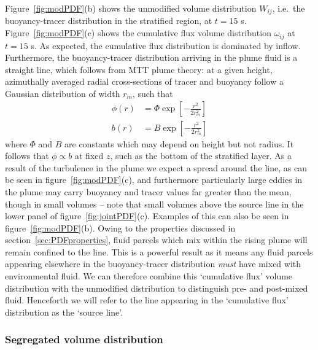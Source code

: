 \documentclass[a4paper]{article}
\begin{document}
Figure~\ref{fig:modPDF}(b) shows the unmodified volume distribution $W_{ij}$, i.e.\ the buoyancy-tracer
distribution in the stratified region, at $t = 15$ s. Figure~\ref{fig:modPDF}(c) shows the cumulative flux
volume distribution $\omega_{ij}$ at $t = 15$ s. As expected, the cumulative flux distribution is dominated by
inflow. Furthermore, the buoyancy-tracer distribution arriving in the plume fluid is a straight line, which
follows from MTT plume theory: at a given height, azimuthally averaged radial cross-sections of tracer and
buoyancy follow a Gaussian distribution of width $r_m$, such that
\begin{align}
	\phi(r) &= \Phi \exp \left[ - \frac{r^2}{2r_m^2}\right] \\
	b(r) &= B \exp \left[ - \frac{r^2}{2r_m^2}\right]
\end{align}
where $\Phi$ and $B$ are constants which may depend on height but not radius. It follows that $\phi \propto b$
at fixed $z$, such as the bottom of the stratified layer. As a result of the turbulence in the plume we expect
a spread around the line, as can be seen in figure~\ref{fig:modPDF}(c), and furthermore particularly large
eddies in the plume may carry buoyancy and tracer values far greater than the mean, though in small volumes --
note that small volumes above the source line in the lower panel of figure~\ref{fig:jointPDF}(c). Examples of
this can also be seen in figure~\ref{fig:modPDF}(b). Owing to the properties discussed in
section~\ref{sec:PDFproperties}, fluid parcels which mix within the rising plume will remain confined to the
line. This is a powerful result as it means any fluid parcels appearing elsewhere in the buoyancy-tracer
distribution \emph{must} have mixed with environmental fluid. We can therefore combine this `cumulative flux'
volume distribution with the unmodified distribution to distinguish pre- and post-mixed fluid. Henceforth we
will refer to the line appearing in the `cumulative flux' distribution as the `source line'.

\subsubsection{Segregated volume distribution}
\label{sec:segjointPDF}
\end{document}
